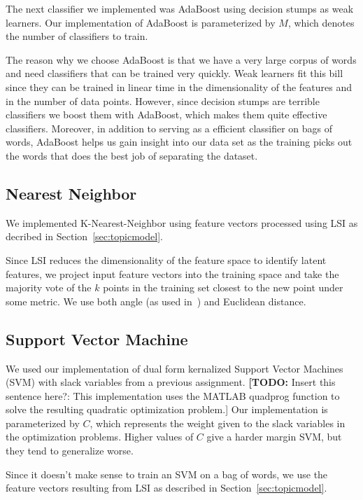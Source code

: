 \documentclass[10pt]{article}
\def\TODO#1{\noindent\textbf{[TODO:} #1]}
\begin{document}
The next classifier we implemented was AdaBoost using decision stumps as weak learners.
Our implementation of AdaBoost is parameterized by $M$, which denotes the number of classifiers to train.

The reason why we choose AdaBoost is that we have a very large corpus of words and need classifiers that can be trained very quickly.
Weak learners fit this bill since they can be trained in linear time in the dimensionality of the features and in the number of data points.
However, since decision stumps are terrible classifiers we boost them with AdaBoost, which makes them quite effective classifiers.
Moreover, in addition to serving as a efficient classifier on bags of words, AdaBoost helps us gain insight into our data set as the training picks out the words that does the best job of separating the dataset.

\subsection{Nearest Neighbor}
\label{sec:nearest-neighbor}

We implemented K-Nearest-Neighbor using feature vectors processed using LSI as decribed in Section~\ref{sec:topicmodel}.

Since LSI reduces the dimensionality of the feature space to identify latent features, we project input feature vectors into the training space and take the majority vote of the $k$ points in the training set closest to the new point under some metric. We use both angle (as used in~\cite{lsi}) and Euclidean distance.

\subsection{Support Vector Machine}
\label{sec:svm}

We used our implementation of dual form kernalized Support Vector Machines (SVM) with slack variables from a previous assignment.
\TODO{Insert this sentence here?: This implementation uses the MATLAB quadprog function to solve the resulting quadratic optimization problem.}
Our implementation is parameterized by $C$, which represents the weight given to the slack variables in the optimization problems. Higher values of $C$ give a harder margin SVM, but they tend to generalize worse.

Since it doesn't make sense to train an SVM on a bag of words, we use the feature vectors resulting from LSI as described in Section~\ref{sec:topicmodel}.
\end{document}
